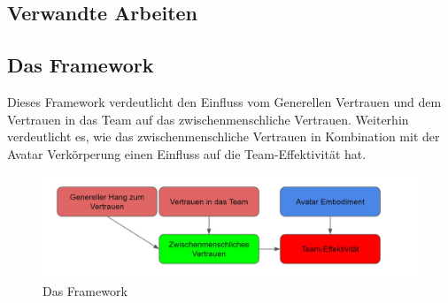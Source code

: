 \documentclass[a4paper,11pt]{article}%
\renewcommand{\\}{\vspace*{0.5\baselineskip} \newline}
\begin{document}
	\subsection{Verwandte Arbeiten}
	
	
	
	

	\subsection{Das Framework}

Dieses Framework verdeutlicht den Einfluss vom Generellen Vertrauen und dem Vertrauen in das Team auf das zwischenmenschliche Vertrauen. 
Weiterhin verdeutlicht es, wie das zwischenmenschliche Vertrauen in Kombination mit der Avatar Verkörperung einen Einfluss auf die Team-Effektivität hat.

	\begin{figure}[H]
		\begin{footnotesize}
			\includegraphics[width=\textwidth]{Abbildungen/Framework.JPG}\\
			\caption[Abbildung 1]{Das Framework}
			\label{Framework}
		\end{footnotesize}
	\end{figure}
\end{document}
